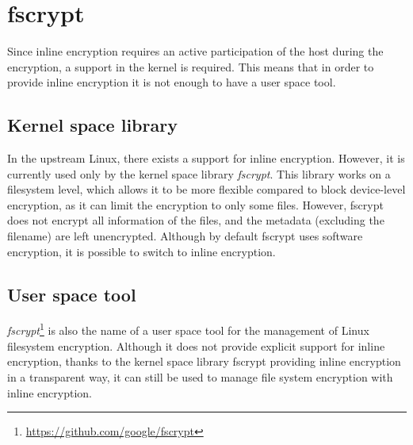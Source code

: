 \section{fscrypt}

Since inline encryption requires an active participation of the host during the encryption, a support in the kernel is required.
This means that in order to provide inline encryption it is not enough to have a user space tool.

\subsection{Kernel space library}

In the upstream Linux, there exists a support for inline encryption. However, it is currently used only by the kernel space library \emph{fscrypt}.
This library works on a filesystem level, which allows it to be more flexible compared to block device-level encryption, as it can limit the encryption to only some files. However, fscrypt does not encrypt all information of the files, and the metadata (excluding the filename) are left unencrypted.
Although by default fscrypt uses software encryption, it is possible to switch to inline encryption.



\subsection{User space tool}

\emph{fscrypt}\footnote{\url{https://github.com/google/fscrypt}} is also the name of a user space tool for the management of Linux filesystem encryption. Although it does not provide explicit support for inline encryption, thanks to the kernel space library fscrypt providing inline encryption in a transparent way, it can still be used to manage file system encryption with inline encryption.


